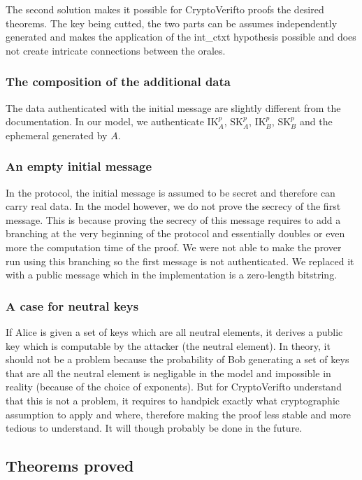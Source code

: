 \documentclass[a4paper, 10pt]{article}
\newcommand{\IK}[2]{\textrm{IK}_#1^#2}
\newcommand{\SK}[2]{\textrm{SK}_#1^#2}
\newcommand{\cv}{CryptoVerif}
\begin{document}
		The second solution makes it possible for \cv to proofs the desired theorems. The key being cutted, the two parts can be assumes independently generated and makes the application of the int\_ctxt hypothesis possible and does not create intricate connections between the orales.
		
		\subsubsection{The composition of the additional data}
		The data authenticated with the initial message are slightly different from the documentation. In our model, we authenticate $\IK{A}{p}$, $\SK{A}{p}$, $\IK{B}{p}$, $\SK{B}{p}$ and the ephemeral generated by $A$.
		
		\subsubsection{An empty initial message}
		In the protocol, the initial message is assumed to be secret and therefore can carry real data. In the model however, we do not prove the secrecy of the first message. This is because proving the secrecy of this message requires to add a branching at the very beginning of the protocol and essentially doubles or even more the computation time of the proof. We were not able to make the prover run using this branching so the first message is not authenticated. We replaced it with a public message which in the implementation is a zero-length bitstring.
		
		\subsubsection{A case for neutral keys}
		If Alice is given a set of keys which are all neutral elements, it derives a public key which is computable by the attacker (the neutral element). In theory, it should not be a problem because the probability of Bob generating a set of keys that are all the neutral element is negligable in the model and impossible in reality (because of the choice of exponents). But for \cv to understand that this is not a problem, it requires to handpick exactly what cryptographic assumption to apply and where, therefore making the proof less stable and more tedious to understand. It will though probably be done in the future.

	\subsection{Theorems proved}
	
\end{document}
